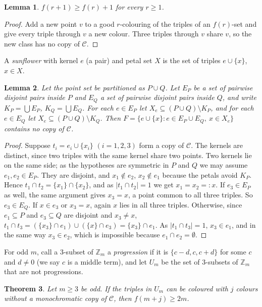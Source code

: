 \documentclass[11pt]{amsart}
\newtheorem{theorem}{Theorem}[section]
\newtheorem{lemma}[theorem]{Lemma}
\theoremstyle{definition}
\theoremstyle{remark}
\newcommand{\Z}{\mathbb{Z}}
\newcommand{\C}{\mathcal{C}}
\begin{document}
\begin{lemma}\label{lem:star}
$f(r+1)\ge f(r)+1$ for every $r\ge1$.
\end{lemma}

\begin{proof}
Add a new point $v$ to a good $r$-colouring of the triples of an $f(r)$-set and give every triple through $v$ a new
colour. Three triples through $v$ share $v$, so the new class has no copy of $\C$.
\end{proof}

A \emph{sunflower} with kernel $e$ (a pair) and petal set $X$ is the set of triples $e\cup\{x\}$, $x\in X$.

\begin{lemma}\label{lem:sun}
Let the point set be partitioned as $P\cup Q$. Let $E_P$ be a set of pairwise disjoint pairs inside $P$ and $E_Q$ a set
of pairwise disjoint pairs inside $Q$, and write $K_P=\bigcup E_P$, $K_Q=\bigcup E_Q$. For each $e\in E_P$ let
$X_e\subseteq (P\cup Q)\setminus K_P$, and for each $e\in E_Q$ let $X_e\subseteq (P\cup Q)\setminus K_Q$. Then
$F=\{e\cup\{x\}: e\in E_P\cup E_Q,\ x\in X_e\}$ contains no copy of $\C$.
\end{lemma}

\begin{proof}
Suppose $t_i=e_i\cup\{x_i\}$ $(i=1,2,3)$ form a copy of $\C$. The kernels are distinct, since two triples with the same
kernel share two points. Two kernels lie on the same side; as the hypotheses are symmetric in $P$ and $Q$ we may
assume $e_1,e_2\in E_P$. They are disjoint, and $x_1\notin e_2$, $x_2\notin e_1$ because the petals avoid $K_P$. Hence
$t_1\cap t_2=\{x_1\}\cap\{x_2\}$, and as $|t_1\cap t_2|=1$ we get $x_1=x_2=:x$. If $e_3\in E_P$ as well, the same
argument gives $x_3=x$, a point common to all three triples. So $e_3\in E_Q$. If $x\in e_3$ or $x_3=x$, again $x$ lies
in all three triples. Otherwise, since $e_1\subseteq P$ and $e_3\subseteq Q$ are disjoint and $x_3\ne x$,
$t_1\cap t_3=(\{x_3\}\cap e_1)\cup(\{x\}\cap e_3)=\{x_3\}\cap e_1$. As $|t_1\cap t_3|=1$, $x_3\in e_1$, and in the
same way $x_3\in e_2$, which is impossible because $e_1\cap e_2=\emptyset$.
\end{proof}

For odd $m$, call a $3$-subset of $\Z_m$ a \emph{progression} if it is $\{c-d,c,c+d\}$ for some $c$ and $d\ne0$ (we say
$c$ is a middle term), and let $U_m$ be the set of $3$-subsets of $\Z_m$ that are not progressions.

\begin{theorem}\label{thm:odd}
Let $m\ge3$ be odd. If the triples in $U_m$ can be coloured with $j$ colours without a monochromatic copy of $\C$, then
$f(m+j)\ge 2m$.
\end{theorem}
\end{document}
